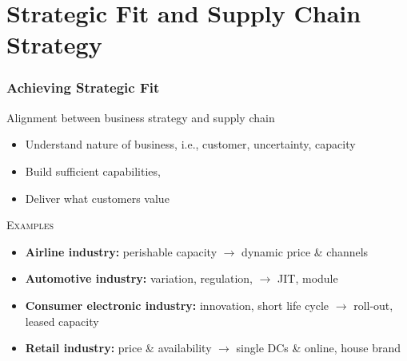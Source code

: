 \documentclass[10pt,handout,notes=show]{beamer}
\begin{document}
\section[SC strategy]{Strategic Fit and Supply Chain Strategy}
\begin{frame}[label=SC-Fit]
  \frametitle{Achieving Strategic Fit \forIE}

   Alignment between \alert{business strategy} and \alert{supply chain}
   \begin{itemize}
    \item Understand \alert{nature of business}, i.e., customer, uncertainty, capacity
    \item Build \alert{sufficient capabilities},
    \item Deliver \alert{what customers value}
   \end{itemize}

  \NextLine
  \textsc{Examples}
  \begin{itemize}
    \item \textbf{Airline industry:} perishable capacity $\rightarrow$ dynamic price \& channels
    \item \textbf{Automotive industry:} variation, regulation, $\rightarrow$ JIT, module
    \item \textbf{Consumer electronic industry:} innovation, short life cycle $\rightarrow$ roll-out, leased capacity
    \item \textbf{Retail industry:} price \& availability $\rightarrow$ single DCs \& online, house brand
  \end{itemize}


\end{frame}
\end{document}
